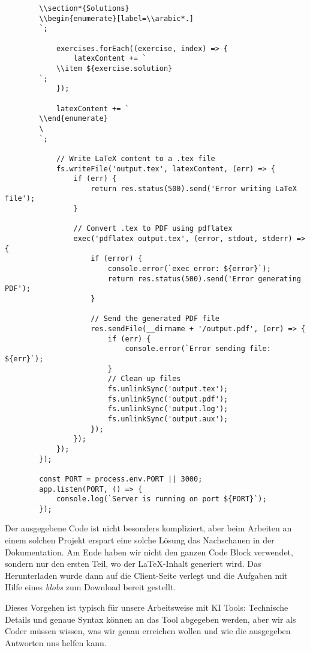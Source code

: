 \begin{description}
\begin{lstlisting}
        \\section*{Solutions}
        \\begin{enumerate}[label=\\arabic*.]
        `;
        
            exercises.forEach((exercise, index) => {
                latexContent += `
            \\item ${exercise.solution}
        `;
            });
        
            latexContent += `
        \\end{enumerate}
        \
        `;
        
            // Write LaTeX content to a .tex file
            fs.writeFile('output.tex', latexContent, (err) => {
                if (err) {
                    return res.status(500).send('Error writing LaTeX file');
                }
        
                // Convert .tex to PDF using pdflatex
                exec('pdflatex output.tex', (error, stdout, stderr) => {
                    if (error) {
                        console.error(`exec error: ${error}`);
                        return res.status(500).send('Error generating PDF');
                    }
        
                    // Send the generated PDF file
                    res.sendFile(__dirname + '/output.pdf', (err) => {
                        if (err) {
                            console.error(`Error sending file: ${err}`);
                        }
                        // Clean up files
                        fs.unlinkSync('output.tex');
                        fs.unlinkSync('output.pdf');
                        fs.unlinkSync('output.log');
                        fs.unlinkSync('output.aux');
                    });
                });
            });
        });
        
        const PORT = process.env.PORT || 3000;
        app.listen(PORT, () => {
            console.log(`Server is running on port ${PORT}`);
        });
            \end{lstlisting}
\end{description}

Der ausgegebene Code ist nicht besonders kompliziert, aber beim Arbeiten an einem solchen Projekt erspart eine solche Lösung das Nachschauen in der Dokumentation. Am Ende haben wir nicht den ganzen Code Block verwendet, sondern nur den ersten Teil, wo der \LaTeX-Inhalt generiert wird. Das Herunterladen wurde dann auf die Client-Seite verlegt und die Aufgaben mit Hilfe eines \emph{blobs} zum Download bereit gestellt. 

Dieses Vorgehen ist typisch für unsere Arbeitsweise mit KI Tools: Technische Details und genaue Syntax können an das Tool abgegeben werden, aber wir als Coder müssen wissen, was wir genau erreichen wollen und wie die ausgegeben Antworten uns helfen kann. 
